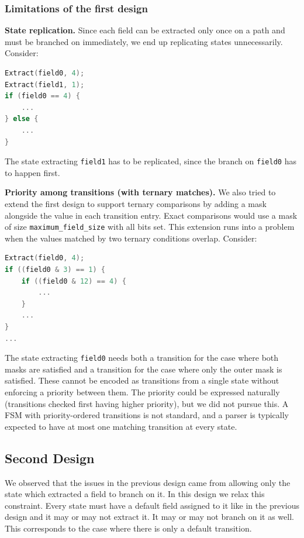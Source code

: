 \subsubsection*{Limitations of the first design}

\textbf{State replication.} Since each field can be extracted only
once on a path and must be branched on immediately, we end up
replicating states unnecessarily. Consider:

\begin{lstlisting}[style=codeside, language=C]
Extract(field0, 4);
Extract(field1, 1);
if (field0 == 4) {
    ...
} else {
    ...
}
\end{lstlisting}

The state extracting \texttt{field1} has to be replicated, since the
branch on \texttt{field0} has to happen first.

\textbf{Priority among transitions (with ternary matches).} We also
tried to extend the first design to support ternary comparisons by
adding a mask alongside the value in each transition entry. Exact
comparisons would use a mask of size
\texttt{maximum\_field\_size} with all bits set. 
This extension runs into a problem when the values matched by two ternary conditions overlap.
Consider:

\begin{lstlisting}[style=codeside, language=C]
Extract(field0, 4);
if ((field0 & 3) == 1) {
    if ((field0 & 12) == 4) {
        ...
    }
    ...
}
...
\end{lstlisting}

The state extracting \texttt{field0} needs both a transition for the
case where both masks are satisfied and a transition for the case
where only the outer mask is satisfied. These cannot be encoded as
transitions from a single state without enforcing a priority between
them. The priority could be expressed naturally (transitions checked
first having higher priority), but we did not pursue this. A
FSM with priority-ordered transitions is not standard, and
a parser is typically expected to have at most one matching
transition at every state.

\subsection{Second Design}

We observed that the issues in the previous design came from
allowing only the state which extracted a field to branch on it. In
this design we relax this constraint. Every state must have a
default field assigned to it like in the previous design and it may
or may not extract it. It may or may not branch on it as well.
This corresponds to the case where there is only a default
transition.

